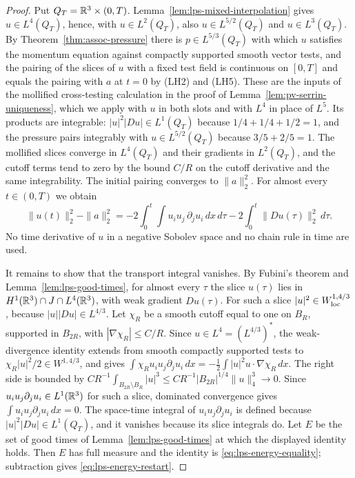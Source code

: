 \documentclass[11pt,letterpaper]{article}
\numberwithin{equation}{section}
\theoremstyle{plain}
\theoremstyle{definition}
\theoremstyle{remark}
\begin{document}
\begin{proof}
Put $Q_T=\mathbb{R}^3\times(0,T)$. Lemma~\ref{lem:lps-mixed-interpolation} gives
$u\in L^4(Q_T)$, hence, with $u\in L^2(Q_T)$, also $u\in L^{5/2}(Q_T)$ and
$u\in L^3(Q_T)$. By Theorem~\ref{thm:assoc-pressure} there is
$p\in L^{5/3}(Q_T)$ with which $u$ satisfies the momentum equation against
compactly supported smooth vector tests, and the pairing of the slices of
$u$ with a fixed test field is continuous on $[0,T]$ and equals the pairing
with $a$ at $t=0$ by (LH2) and (LH5). These are the inputs of the mollified
cross-testing calculation in the proof of
Lemma~\ref{lem:pv-serrin-uniqueness}, which we apply with $u$ in both slots
and with $L^4$ in place of $L^5$. Its products are integrable:
$|u|^2|Du|\in L^1(Q_T)$ because $1/4+1/4+1/2=1$, and the pressure pairs
integrably with $u\in L^{5/2}(Q_T)$ because $3/5+2/5=1$. The mollified
slices converge in $L^4(Q_T)$ and their gradients in $L^2(Q_T)$, and the
cutoff terms tend to zero by the bound $C/R$ on the cutoff derivative and
the same integrability. The initial pairing converges to $\|a\|_2^2$.
For almost every $t\in(0,T)$ we obtain
\begin{equation*}
\|u(t)\|_2^2-\|a\|_2^2
=-2\int_0^t\!\!\int u_iu_j\,\partial_ju_i\,dx\,d\tau
 -2\int_0^t\|Du(\tau)\|_2^2\,d\tau .
\end{equation*}
No time derivative of $u$ in a negative Sobolev space and no chain rule in
time are used.

It remains to show that the transport integral vanishes. By Fubini's
theorem and Lemma~\ref{lem:lps-good-times}, for almost every $\tau$ the
slice $u(\tau)$ lies in $H^1(\mathbb{R}^3)\cap J\cap L^4(\mathbb{R}^3)$, with weak gradient
$Du(\tau)$. For such a slice $|u|^2\in W^{1,4/3}_{\rm loc}$, because
$|u||Du|\in L^{4/3}$. Let $\chi_R$ be a smooth cutoff equal to one on
$B_R$, supported in $B_{2R}$, with $|\nabla\chi_R|\le C/R$. Since
$u\in L^4=(L^{4/3})^*$, the weak-divergence identity extends from
smooth compactly supported tests to $\chi_R|u|^2/2\in W^{1,4/3}$, and gives
$\int\chi_Ru_iu_j\partial_ju_i\,dx=-\frac12\int|u|^2u\cdot\nabla\chi_R\,dx$.
The right side is bounded by
$CR^{-1}\int_{B_{2R}\setminus B_R}|u|^3\le CR^{-1}|B_{2R}|^{1/4}\|u\|_4^3
\to0$. Since $u_iu_j\partial_ju_i\in L^1(\mathbb{R}^3)$ for such a slice, dominated
convergence gives $\int u_iu_j\partial_ju_i\,dx=0$. The space-time integral
of $u_iu_j\partial_ju_i$ is defined because $|u|^2|Du|\in L^1(Q_T)$, and it
vanishes because its slice integrals do. Let $E$ be the set of good times of
Lemma~\ref{lem:lps-good-times} at which the displayed identity holds. Then
$E$ has full measure and the identity is \eqref{eq:lps-energy-equality};
subtraction gives \eqref{eq:lps-energy-restart}.
\end{proof}
\end{document}
